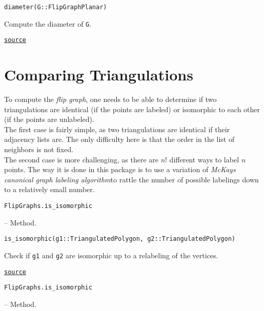 \begin{adjustwidth}{2em}{0pt}


\begin{verbatim}
diameter(G::FlipGraphPlanar)
\end{verbatim}

Compute the diameter of \texttt{G}.



\href{https://github.com/schto223/FlipGraphs.jl/blob/e35d43698a06b86273148826b79d585ba04fcd26/src/flipGraphPlanar.jl#L373-L377}{\texttt{source}}


\end{adjustwidth}

\section{Comparing Triangulations}



\label{9598979154961159507}{}


To compute the \emph{flip graph}, one needs to be able to determine if two triangulations are identical (if the points are labeled) or isomorphic to each other (if the points are unlabeled). \\
The first case is fairly simple, as two triangulations are identical if their adjacency lists are. The only difficulty here is that the order in the list of neighbors is not fixed.\\
The second case is more challenging, as there are \(n!\) different ways to label \(n\) points. The way it is done in this package is to use a variation of \emph{McKay{\textquotesingle}s canonical graph labeling algorithm}\footnotemark[1] to rattle the number of possible labelings down to a relatively small number.


\hypertarget{3606704227605247881}{\texttt{FlipGraphs.is\_isomorphic}}  -- {Method.}

\begin{adjustwidth}{2em}{0pt}


\begin{verbatim}
is_isomorphic(g1::TriangulatedPolygon, g2::TriangulatedPolygon)
\end{verbatim}

Check if \texttt{g1} and \texttt{g2} are isomorphic up to a relabeling of the vertices.



\href{https://github.com/schto223/FlipGraphs.jl/blob/e35d43698a06b86273148826b79d585ba04fcd26/src/flipGraphPlanar.jl#L357-L361}{\texttt{source}}


\end{adjustwidth}
\hypertarget{15972932308511385085}{\texttt{FlipGraphs.is\_isomorphic}}  -- {Method.}

